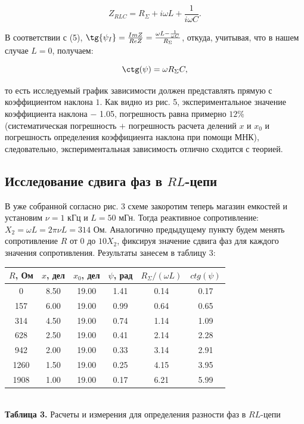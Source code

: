 \documentclass[a4paper,12pt]{article} %
\begin{document}
\begin{equation}\label{ linkname }
Z_{RLC} = R_{\Sigma} + i\omega L + \frac{1}{i\omega C}.
\end{equation}

\hfill \break В соответствии с (5), $\tg{\psi_{I}} = \frac{Im Z}{Re Z} = \frac{\omega L - \frac{1}{\omega C}}{R_{\Sigma}}$, откуда, учитывая, что в нашем случае $L = 0$, получаем:

$$
\ctg(\psi) = \omega R_{\Sigma}C,
$$

\hfill \break то есть исследуемый график зависимости должен представлять прямую с коэффициентом наклона $1$. Как видно из рис. 5, экспериментальное значение коэффициента наклона $-$ 1.05, погрешность равна примерно $12\%$ (систематическая погрешность $+$ погрешность расчета делений $x$ и $x_{0}$ и погрешность определения коэффициента наклона при помощи МНК), следовательно, экспериментальная зависимость отлично сходится с теорией.

\subsection{Исследование сдвига фаз в $RL$-цепи}
\hfill \break В уже собранной согласно рис. 3 схеме закоротим теперь магазин емкостей и установим $\nu = 1$ кГц и $L = 50$ мГн. Тогда реактивное сопротивление: $X_{2} = \omega L = 2\pi \nu L = 314$ Ом. Аналогично предыдущему пункту будем менять сопротивление $R$ от $0$ до $10X_{2}$, фиксируя значение сдвига фаз для каждого значения сопротивления. Результаты занесем в таблицу 3:

\begin{center}
\begin{tabular}{|c|c|c|c|c|c|}\hline
$ R $, Ом & $ x $, дел & $ x_{0} $, дел & $ \psi $, рад & $ R_{\Sigma}/(\omega L) $ & $ ctg(\psi) $\\\hline
0 & 8.50 & 19.00 & 1.41 & 0.14 & 0.17 \\\hline
157 & 6.00 & 19.00 & 0.99 & 0.64 & 0.65 \\\hline
314 & 4.50 & 19.00 & 0.74 & 1.14 & 1.09 \\\hline
628 & 2.50 & 19.00 & 0.41 & 2.14 & 2.28 \\\hline
942 & 2.00 & 19.00 & 0.33 & 3.14 & 2.91 \\\hline
1260 & 1.50 & 19.00 & 0.25 & 4.15 & 3.95 \\\hline
1908 & 1.00 & 19.00 & 0.17 & 6.21 & 5.99 \\\hline
\end{tabular} \\
\hfill \break \textbf {Таблица 3.} Расчеты и измерения для определения разности фаз в $RL$-цепи\\
\end{center}
\end{document}
